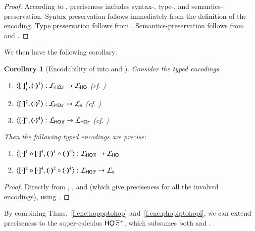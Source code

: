 \documentclass[preprint,11pt]{elsarticle}
\newtheorem{corollary}{Corollary}[section]
\begin{document}
{{\begin{proof}
According to , preciseness includes syntax-, type-, and semantics-preservation. 
Syntax preservation follows immediately from the definition of the encoding. 
Type preservation follows from 
.
Semantics-preservation follows from 	
 and 
.
\end{proof}

We then have the following corollary:

\begin{corollary}[Encodability of \PHOp into \HOp and \sessp]
\label{coro:poly}
Consider the typed encodings
\begin{enumerate}[-]
\item $\enco{\map{\cdot}^{1}_f, \mapt{\cdot}^{1} %
}: \tyl{L}_{\HOp} \to \tyl{L}_{\HO}$  (cf. )
\item $\enco{\map{\cdot}^{2}, \mapt{\cdot}^{2} %
}: \tyl{L}_{\HOp} \to \tyl{L}_{\sessp}$ (cf. )
\item $\enco{\map{\cdot}^{4}, \mapt{\cdot}^{4}}: \tyl{L}_{\PHOp} \to \tyl{L}_{\HOp}$ (cf. )
\end{enumerate}
Then the following typed encodings 	are precise:
\begin{enumerate}[-]
\item 
$\enco{\pmap{\cdot}{1} \circ \pmap{\cdot}{4}, \tmap{\cdot}{1} \circ \tmap{\cdot}{4}}: \tyl{L}_{\PHOp} \to \tyl{L}_\HO$
\item
$\enco{\pmap{\cdot}{2} \circ \pmap{\cdot}{4}, \tmap{\cdot}{2} \circ \tmap{\cdot}{4}}: \tyl{L}_{\PHOp} \to \tyl{L}_\sessp$
\end{enumerate}

\end{corollary}

\begin{proof}
Directly from 
, 
, 
and 
 (which give preciseness for all the involved encodings), using
.
\end{proof}




By combining Thms.~\ref{f:enc:hoppptohop} and~\ref{f:enc:phopiptohopi},
we can extend preciseness to the super-calculus
$\mathsf{HO}\,{\widetilde{\pi}}^{\,+}$, which subsumes both \HOpp and \PHOp.


}}
\end{document}
